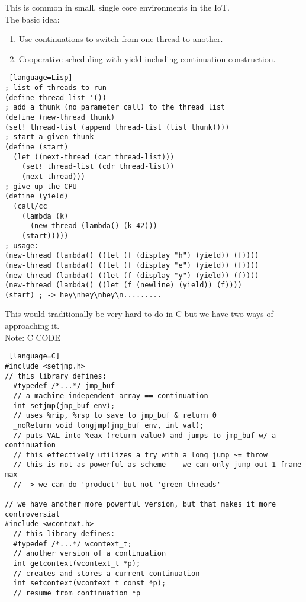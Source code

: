 \documentclass[../../lecture_notes.tex]{subfiles}
\begin{document}
 This is common in small, single core environments in the IoT.\\
 The basic idea:
 \begin{enumerate} [itemsep=0mm]
	\item Use continuations to switch from one thread to another.
	\item Cooperative scheduling with yield including continuation construction.\\
\end{enumerate}
\begin{lstlisting} [language=Lisp]
; list of threads to run
(define thread-list '())
; add a thunk (no parameter call) to the thread list
(define (new-thread thunk)
(set! thread-list (append thread-list (list thunk))))
; start a given thunk
(define (start)
  (let ((next-thread (car thread-list)))
    (set! thread-list (cdr thread-list))
    (next-thread)))
; give up the CPU
(define (yield)
  (call/cc
    (lambda (k)
      (new-thread (lambda() (k 42)))
    (start)))))
; usage:
(new-thread (lambda() ((let (f (display "h") (yield)) (f))))
(new-thread (lambda() ((let (f (display "e") (yield)) (f))))
(new-thread (lambda() ((let (f (display "y") (yield)) (f))))
(new-thread (lambda() ((let (f (newline) (yield)) (f))))
(start) ; -> hey\nhey\nhey\n.........
\end{lstlisting}
\noindent This would traditionally be very hard to do in C but we have two ways of approaching it.\\
Note: C CODE\\
\begin{lstlisting} [language=C]
#include <setjmp.h>
// this library defines:
  #typedef /*...*/ jmp_buf 
  // a machine independent array == continuation
  int setjmp(jmp_buf env); 
  // uses %rip, %rsp to save to jmp_buf & return 0
  _noReturn void longjmp(jmp_buf env, int val);
  // puts VAL into %eax (return value) and jumps to jmp_buf w/ a continuation
  // this effectively utilizes a try with a long jump ~= throw
  // this is not as powerful as scheme -- we can only jump out 1 frame max
  // -> we can do 'product' but not 'green-threads'
 
// we have another more powerful version, but that makes it more controversial
#include <wcontext.h>
  // this library defines:
  #typedef /*...*/ wcontext_t;
  // another version of a continuation
  int getcontext(wcontext_t *p);
  // creates and stores a current continuation
  int setcontext(wcontext_t const *p);
  // resume from continuation *p
\end{lstlisting} \medskip
\end{document}
